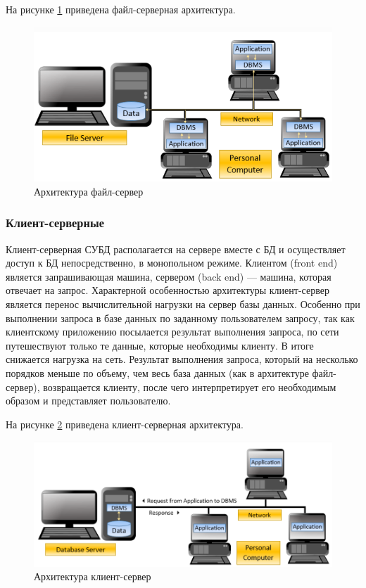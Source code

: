 На рисунке \ref{img:filesever} приведена файл-серверная архитектура.
\begin{figure}[h!]
	\centering
	\includegraphics[height=0.3\textheight]{img/filesever} %
	\caption{Архитектура файл-сервер \cite{architec}}
	\label{img:filesever}
\end{figure}
\subsubsection{Клиент-серверные}
Клиент-серверная СУБД располагается на сервере вместе с БД и осуществляет доступ к БД непосредственно, в монопольном режиме.
Клиентом (front end) является запрашивающая машина, сервером (back end) --- машина,
которая отвечает на запрос.
Характерной особенностью архитектуры клиент-сервер является перенос вычислительной нагрузки на сервер базы данных.
Особенно при выполнении запроса в базе данных по заданному пользователем запросу, так как клиентскому приложению посылается результат выполнения запроса, по сети путешествуют только те данные, которые необходимы клиенту. В итоге снижается нагрузка на сеть.
Результат выполнения запроса, который на несколько порядков меньше по объему, чем весь база данных (как в архитектуре файл-сервер), возвращается клиенту,
после чего интерпретирует его необходимым образом и представляет пользователю.

На рисунке \ref{img:clientsever} приведена клиент-серверная архитектура.

\begin{figure}[h!]
	\centering
	\includegraphics[height=0.25\textheight]{img/clientsever} %
	\caption{Архитектура клиент-сервер \cite{architec}}
	\label{img:clientsever}
\end{figure}

